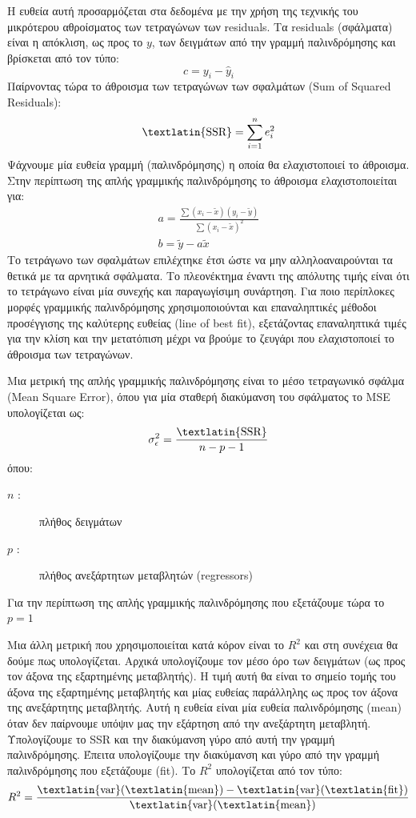 Η ευθεία αυτή προσαρμόζεται στα δεδομένα με την χρήση της τεχνικής του μικρότερου
αθροίσματος των τετραγώνων των \textlatin{residuals}. Τα \textlatin{residuals} (σφάλματα) είναι η απόκλιση, ως
προς το $y$, των δειγμάτων από την γραμμή παλινδρόμησης και βρίσκεται από τον τύπο:
$$c=y_i-\widehat{y}_i$$
Παίρνοντας τώρα το άθροισμα των τετραγώνων των σφαλμάτων (\textlatin{Sum of Squared Residuals}):
$$\text{\textlatin{SSR}}=\sum\limits_{i=1}^{n}e_i^2$$
Ψάχνουμε μία ευθεία γραμμή (παλινδρόμησης) η οποία θα ελαχιστοποιεί το άθροισμα. Στην
περίπτωση της απλής γραμμικής παλινδρόμησης το άθροισμα ελαχιστοποιείται για:
\begin{gather*}
    a=\frac{\sum(x_i-\widetilde{x})(y_i-\widetilde{y})}{\sum(x_i-\widetilde{x})^2} \\
    b=\widetilde{y}-a\widetilde{x}
\end{gather*}
Το τετράγωνο των σφαλμάτων επιλέχτηκε έτσι ώστε να μην αλληλοαναιρούνται τα θετικά με
τα αρνητικά σφάλματα. Το πλεονέκτημα έναντι της απόλυτης τιμής είναι ότι το τετράγωνο
είναι μία συνεχής και παραγωγίσιμη συνάρτηση. Για ποιο περίπλοκες μορφές γραμμικής
παλινδρόμησης χρησιμοποιούνται και επαναληπτικές μέθοδοι προσέγγισης της καλύτερης
ευθείας (\textlatin{line of best fit}), εξετάζοντας επαναληπτικά τιμές για την κλίση και την μετατόπιση
μέχρι να βρούμε το ζευγάρι που ελαχιστοποιεί το άθροισμα των τετραγώνων.

\sloppy
Μια μετρική της απλής γραμμικής παλινδρόμησης είναι το μέσο τετραγωνικό σφάλμα (\textlatin{Mean Square Error}),
όπου για μία σταθερή διακύμανση του σφάλματος το \textlatin{MSE} υπολογίζεται ως:
\fussy
$$\sigma_\epsilon^2=\frac{\text{\textlatin{SSR}}}{n-p-1}$$
όπου:
\begin{description}
    \item[$n$ :] πλήθος δειγμάτων
    \item[$p$ :] πλήθος ανεξάρτητων μεταβλητών (\textlatin{regressors})
\end{description}
Για την περίπτωση της απλής γραμμικής παλινδρόμησης που εξετάζουμε τώρα το $p=1$

Μια άλλη μετρική που χρησιμοποιείται κατά κόρον είναι το $R^2$ και στη συνέχεια θα δούμε πως υπολογίζεται.
Αρχικά υπολογίζουμε τον μέσο όρο των δειγμάτων (ως προς τον άξονα της εξαρτημένης
μεταβλητής). Η τιμή αυτή θα είναι το σημείο τομής του άξονα της εξαρτημένης μεταβλητής
και μίας ευθείας παράλληλης ως προς τον άξονα της ανεξάρτητης μεταβλητής. Αυτή η ευθεία
είναι μία ευθεία παλινδρόμησης (\textlatin{mean}) όταν δεν παίρνουμε υπόψιν μας την εξάρτηση από
την ανεξάρτητη μεταβλητή. Υπολογίζουμε το \textlatin{SSR} και την διακύμανση γύρο από αυτή την
γραμμή παλινδρόμησης. Έπειτα υπολογίζουμε την διακύμανση και γύρο από την γραμμή
παλινδρόμησης που εξετάζουμε (\textlatin{fit}). Το $R^2$ υπολογίζεται από τον τύπο:
$$R^2=\frac{\text{\textlatin{var}}(\text{\textlatin{mean}})-\text{\textlatin{var}}(\text{\textlatin{fit}})}{\text{\textlatin{var}}(\text{\textlatin{mean}})}$$

